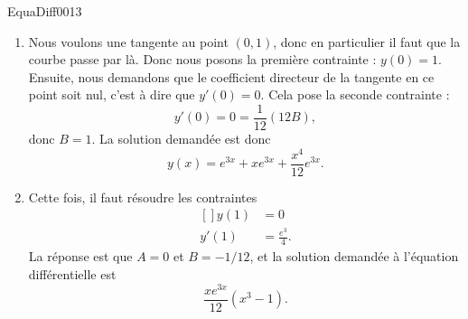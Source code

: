 \begin{corrige}{EquaDiff0013}
\begin{enumerate}
\begin{enumerate}
				\item
					Nous voulons une tangente au point $(0,1)$, donc en particulier il faut que la courbe passe par là. Donc nous posons la première contrainte : $y(0)=1$. Ensuite, nous demandons que le coefficient directeur de la tangente en ce point soit nul, c'est à dire que $y'(0)=0$. Cela pose la seconde contrainte : 
					\begin{equation}
						y'(0)=0=\frac{ 1 }{ 12 }(12B), 
					\end{equation}
					donc $B=1$. La solution demandée est donc
					\begin{equation}
						y(x)= e^{3x}+x e^{3x}+\frac{ x^4 }{ 12 } e^{3x}.
					\end{equation}

				\item
					Cette fois, il faut résoudre les contraintes
					\begin{equation}
						\begin{aligned}[]
							y(1)&=0\\
							y'(1)&=\frac{ e^3 }{ 4 }.
						\end{aligned}
					\end{equation}
					La réponse est que $A=0$ et $B=-1/12$, et la solution demandée à l'équation différentielle est
					\begin{equation}
						\frac{ x e^{3x} }{ 12 }(x^3-1).
					\end{equation}
			\end{enumerate}
	\end{enumerate}
\end{corrige}
